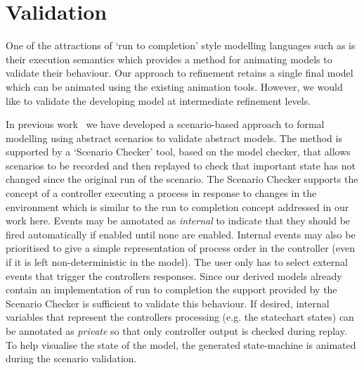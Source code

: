 

\section{Validation}
\label{sec:validation}

One of the attractions of `run to completion' style modelling languages such as \SCXML is their execution semantics which provides a method for animating models to validate their behaviour.
Our approach to \SCXML refinement retains a single \SCXML final model which can be animated using the existing \SCXML animation tools.
However, we would like to validate the developing \UMLB model at intermediate refinement levels.

In previous work~\cite{snook20JSA} we have developed a scenario-based approach to formal modelling using abstract scenarios to validate abstract models.
The method is supported by a `Scenario Checker' tool, based on the \PROB model checker, that allows scenarios to be recorded and then replayed to check that important state has not changed since the original run of the scenario.
The Scenario Checker supports the concept of a controller executing a process in response to changes in the environment which is similar to the run to completion concept addressed in our work here.
Events may be annotated as \emph{internal} to indicate that they should be fired automatically if enabled until none are enabled. 
Internal events may also be prioritised to give a simple representation of process order in the controller (even if it is left non-deterministic in the model).
The user only has to select external events that trigger the controllers responses.
Since our \SCXML derived models already contain an implementation of run to completion the support provided by the Scenario Checker is sufficient to validate this behaviour.
If desired, internal variables that represent the controllers processing (e.g. the \SCXML statechart states) can be annotated as \emph{private} so that only controller output is checked during replay.
To help visualise the state of the model, the generated \UMLB state-machine is animated during the scenario validation.

